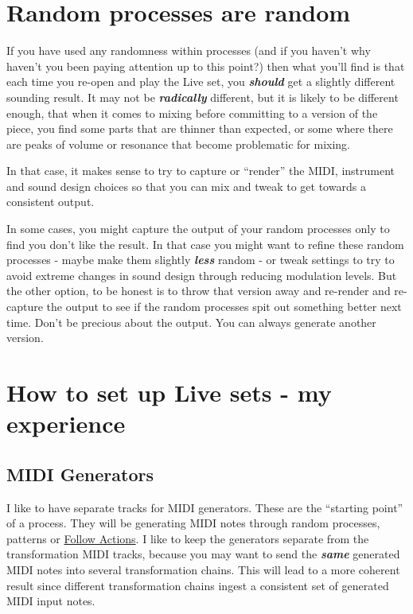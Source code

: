 \documentclass[
  12pt,
  letterpaper,
  oneside,
  open=any]{scrbook}
\begin{document}
\section{Random processes are random}\label{random-processes-are-random}

If you have used any randomness within processes (and if you haven't why
haven't you been paying attention up to this point?) then what you'll
find is that each time you re-open and play the Live set, you
\textbf{\emph{should}} get a slightly different sounding result. It may
not be \textbf{\emph{radically}} different, but it is likely to be
different enough, that when it comes to mixing before committing to a
version of the piece, you find some parts that are thinner than
expected, or some where there are peaks of volume or resonance that
become problematic for mixing.

In that case, it makes sense to try to capture or ``render'' the MIDI,
instrument and sound design choices so that you can mix and tweak to get
towards a consistent output.

In some cases, you might capture the output of your random processes
only to find you don't like the result. In that case you might want to
refine these random processes - maybe make them slightly
\textbf{\emph{less}} random - or tweak settings to try to avoid extreme
changes in sound design through reducing modulation levels. But the
other option, to be honest is to throw that version away and re-render
and re-capture the output to see if the random processes spit out
something better next time. Don't be precious about the output. You can
always generate another version.

\section{How to set up Live sets - my
experience}\label{how-to-set-up-live-sets---my-experience}

\subsection{MIDI Generators}\label{midi-generators}

I like to have separate tracks for MIDI generators. These are the
``starting point'' of a process. They will be generating MIDI notes
through random processes, patterns or
\hyperref[Chapter-003-Process-Follow_Actions]{Follow Actions}. I like to
keep the generators separate from the transformation MIDI tracks,
because you may want to send the \textbf{\emph{same}} generated MIDI
notes into several transformation chains. This will lead to a more
coherent result since different transformation chains ingest a
consistent set of generated MIDI input notes.
\end{document}
